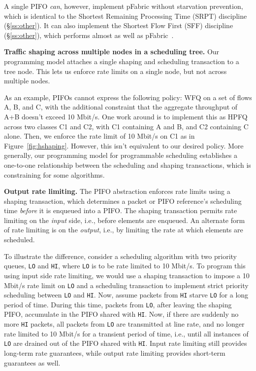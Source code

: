 A single PIFO {\em can}, however, implement pFabric without starvation prevention,
which is identical to the Shortest Remaining Processing Time (SRPT) discipline
(\S\ref{ss:other}).  It can also implement the Shortest Flow First (SFF)
discipline (\S\ref{ss:other}), which performs almost as well as
pFabric~\cite{pFabric}.

\medskip
\noindent 
\textbf{Traffic shaping across multiple nodes in a scheduling tree.}  Our
programming model attaches a single shaping and scheduling transaction
to a tree node. This lets us enforce rate limits on a single node, but not
across multiple nodes.

As an example, PIFOs
cannot express the following policy: WFQ on a set of flows A, B, and
C, with the additional constraint that the aggregate throughput of A+B
doesn't exceed 10 Mbit/s. One work around is to implement this as HPFQ
across two classes C1 and C2, with C1 containing A and B, and C2
containing C alone. Then, we enforce the rate limit of 10 Mbit/s on
C1 as in Figure~\ref{fig:hshaping}. However, this isn't equivalent to our desired policy. More
generally, our programming model for programmable scheduling
establishes a one-to-one relationship between the scheduling and
shaping transactions, which is constraining for some algorithms.

\medskip
\noindent
\textbf{Output rate limiting.} The PIFO abstraction enforces rate
limits using a shaping transaction, which determines a packet or PIFO
reference's scheduling time {\em before} it is enqueued into a PIFO.
The shaping transaction permits rate limiting on the {\em input} side,
i.e., before elements are enqueued. An alternate form of rate limiting
is on the {\em output}, i.e., by limiting the rate at which elements
are scheduled.

To illustrate the difference, consider a scheduling algorithm with two
priority queues, \texttt{LO} and \texttt{HI}, where \texttt{LO} is to
be rate limited to 10 Mbit/s. To program this using input side rate
limiting, we would use a shaping transaction to impose a 10 Mbit/s
rate limit on \texttt{LO} and a scheduling transaction to implement
strict priority scheduling between \texttt{LO} and \texttt{HI}. Now,
assume packets from \texttt{HI} starve \texttt{LO} for a long
period of time. During this time, packets from \texttt{LO}, after
leaving the shaping PIFO, accumulate in the PIFO shared with
\texttt{HI}. Now, if there are suddenly no more \texttt{HI} packets,
all packets from \texttt{LO} are transmitted at line rate, and no
longer rate limited to 10 Mbit/s for a transient period of time,
i.e., until all instances of \texttt{LO} are drained out of the PIFO
shared with \texttt{HI}. Input rate limiting still provides long-term
rate guarantees, while output rate limiting provides short-term
guarantees as well.
